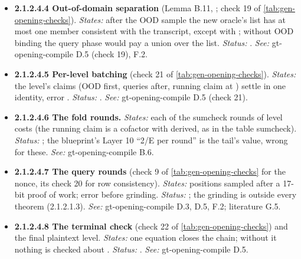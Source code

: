 \begin{itemize}[label={}, leftmargin=1.3em, itemindent=-1.3em, labelwidth=0pt, labelsep=0pt, itemsep=4pt, topsep=3pt]
\begin{itemize}[label={}, leftmargin=1.3em, itemindent=-1.3em, labelwidth=0pt, labelsep=0pt, itemsep=4pt, topsep=3pt]
\begin{itemize}[label={}, leftmargin=1.3em, itemindent=-1.3em, labelwidth=0pt, labelsep=0pt, itemsep=4pt, topsep=3pt]
\item {}\label{obl:node-2.1.2.4.4}\textbf{2.1.2.4.4 Out-of-domain separation} (Lemma B.11, ; check 19 of \cref{tab:gen-opening-checks}). \emph{States:} after the OOD sample the new oracle's list has at most one member consistent with the transcript, except with ; without OOD binding the query phase would pay a union over the list. \emph{Status:} . \emph{See:} gt-opening-compile D.5 (check 19), F.2.
\item {}\label{obl:node-2.1.2.4.5}\textbf{2.1.2.4.5 Per-level batching} (check 21 of \cref{tab:gen-opening-checks}). \emph{States:} the level's claims (OOD first, queries after, running claim at ) settle in one identity, error . \emph{Status:} . \emph{See:} gt-opening-compile D.5 (check 21).
\item {}\label{obl:node-2.1.2.4.6}\textbf{2.1.2.4.6 The fold rounds.} \emph{States:} each of the  sumcheck rounds of level  costs  (the running claim is a cofactor with  derived, as in the table sumcheck). \emph{Status:} ; the blueprint's Layer 10 ``2/\textbar{}E\textbar{} per round'' is the tail's value, wrong for these. \emph{See:} gt-opening-compile B.6.
\item {}\label{obl:node-2.1.2.4.7}\textbf{2.1.2.4.7 The query rounds} (check 9 of \cref{tab:gen-opening-checks} for the nonce, its check 20 for row consistency). \emph{States:}  positions sampled after a 17-bit proof of work; error  before grinding. \emph{Status:} ; the grinding is outside every theorem (2.1.2.1.3). \emph{See:} gt-opening-compile D.3, D.5, F.2; literature G.5.
\item {}\label{obl:node-2.1.2.4.8}\textbf{2.1.2.4.8 The terminal check} (check 22 of \cref{tab:gen-opening-checks}) and the final plaintext level. \emph{States:} one equation  closes the chain; without it nothing is checked about . \emph{Status:} . \emph{See:} gt-opening-compile D.5.

\end{itemize}
\end{itemize}
\end{itemize}
